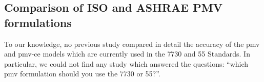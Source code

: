 %
%

\subsection{Comparison of ISO and ASHRAE PMV formulations}\label{subsec:comparision-of-pmv-formulations}
To our knowledge, no previous study compared in detail the accuracy of the \ac{pmv} and \gls{pmv-ce} models which are currently used in the \gls{7730} and \gls{55} Standards.
In particular, we could not find any study which answered the questions: ``which \ac{pmv} formulation should you use the \gls{7730} or \gls{55}?''.

